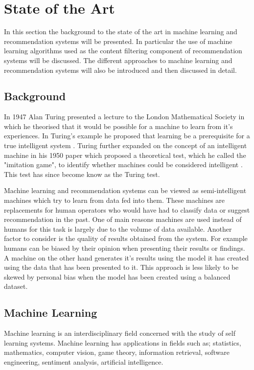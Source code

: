 \chapter{State of the Art}

In this section the background to the state of the art in machine learning and recommendation systems will be presented.
In particular the use of machine learning algorithms used as the content filtering component of recommendation systems will be discussed.
The different approaches to machine learning and recommendation systems will also be introduced and then discussed in detail.

\section{Background}
In 1947 Alan Turing presented a lecture to the London Mathematical Society in which he theorised that it would be possible for a machine to learn from it's experiences.
In Turing's example he proposed that learning be a prerequisite for a true intelligent system \cite{Turing1946}.
Turing further expanded on the concept of an intelligent machine in his 1950 paper which proposed a theoretical test, which he called the "imitation game", to identify whether machines could be considered intelligent \cite{Turing1950}.
This test has since become know as the Turing test.

Machine learning and recommendation systems can be viewed as semi-intelligent machines which try to learn from data fed into them.
These machines are replacements for human operators who would have had to classify data or suggest recommendation in the past.
One of main reasons machines are used instead of humans for this task is largely due to the volume of data available.
Another factor to consider is the quality of results obtained from the system.
For example humans can be biased by their opinion when presenting their results or findings.
A machine on the other hand generates it's results using the model it has created using the data that has been presented to it.
This approach is less likely to be skewed by personal bias when the model has been created using a balanced dataset\cite{FProvost2000}.

\section{Machine Learning}
Machine learning is an interdisciplinary field concerned with the study of self learning systems.
Machine learning has applications in fields such as; statistics, mathematics, computer vision, game theory, information retrieval, software engineering, sentiment analysis, artificial intelligence.

